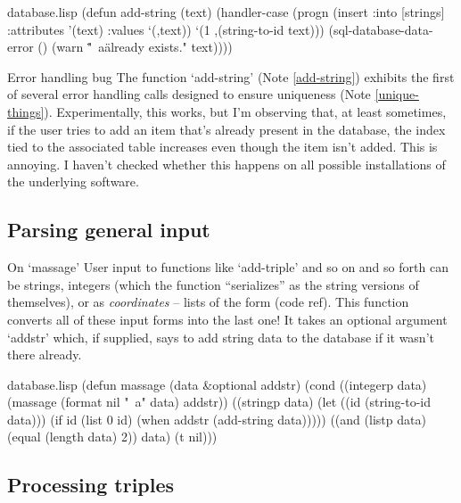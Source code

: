 \begin{common}{database.lisp}
(defun add-string (text)
  (handler-case
   (progn (insert :into [strings]
                  :attributes '(text)
                  :values `(,text))
          `(1 ,(string-to-id text)))
   (sql-database-data-error ()
     (warn "\"~a\" already exists."
           text))))
\end{common}

\begin{notate}{Error handling bug}
The function `add-string' (Note \ref{add-string}) exhibits
the first of several error handling calls designed to
ensure uniqueness (Note \ref{unique-things}).
Experimentally, this works, but I'm observing that, at
least sometimes, if the user tries to add an item that's
already present in the database, the index tied to the
associated table increases even though the item isn't
added.  This is annoying.  I haven't checked whether this
happens on all possible installations of the underlying
software.
\end{notate}

\subsection*{Parsing general input}

\begin{notate}{On `massage'} \label{massage}
User input to functions like `add-triple' and so on and so
forth can be strings, integers (which the function
``serializes'' as the string versions of themselves), or
as \emph{coordinates} -- lists of the form (code ref).
This function converts all of these input forms into the
last one!  It takes an optional argument `addstr' which,
if supplied, says to add string data to the database if it
wasn't there already.
\end{notate}

\begin{common}{database.lisp}
(defun massage (data &optional addstr)
  (cond
   ((integerp data)
    (massage (format nil "~a" data) addstr))
   ((stringp data)
    (let ((id (string-to-id data)))
      (if id
          (list 0 id)
          (when addstr
            (add-string data)))))
   ((and (listp data)
         (equal (length data) 2))
    data)
   (t nil)))
\end{common}


\subsection*{Processing triples}

